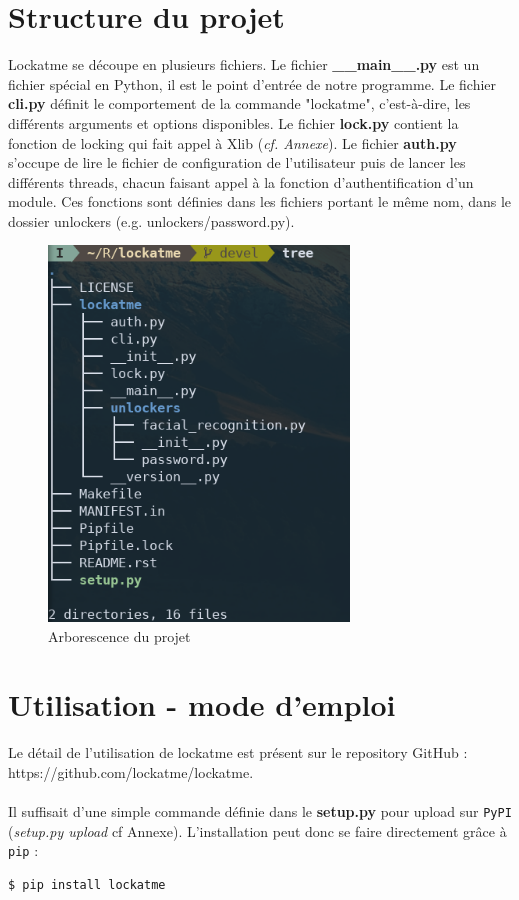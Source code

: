 \documentclass[french]{report}
\begin{document}
\section{Structure du projet}
Lockatme se découpe en plusieurs fichiers. Le fichier \textbf{\_\_main\_\_.py} est un fichier
spécial en Python, il est le point d'entrée de notre programme. Le fichier \textbf{cli.py}
définit le comportement de la commande "lockatme", c'est-à-dire, les différents
arguments et options disponibles.
Le fichier \textbf{lock.py} contient la fonction de locking qui fait appel à Xlib (\emph{cf. Annexe}).
Le fichier \textbf{auth.py} s'occupe de lire le fichier de configuration de l'utilisateur
puis de lancer les différents threads, chacun faisant appel à la fonction
d'authentification d'un module. Ces fonctions sont définies dans les
fichiers portant le même nom, dans le dossier unlockers (e.g. unlockers/password.py).

\begin{figure}[h]\label{fig:tree}
\begin{center}
  \includegraphics[width=80mm,scale=0.5]{tree}
\end{center}
  \caption{Arborescence du projet}
  \label{fig:tree}
\end{figure}

\section{Utilisation - mode d'emploi}
Le détail de l'utilisation de lockatme est présent sur le repository GitHub :\\
https://github.com/lockatme/lockatme.\\\\
Il suffisait d'une simple commande définie dans le \textbf{setup.py} pour
upload sur \texttt{PyPI} (\emph{setup.py upload} cf Annexe).
L'installation peut donc se faire directement grâce à \texttt{pip} :
\begin{lstlisting}[language=bash]
  $ pip install lockatme
\end{lstlisting}
\end{document}
